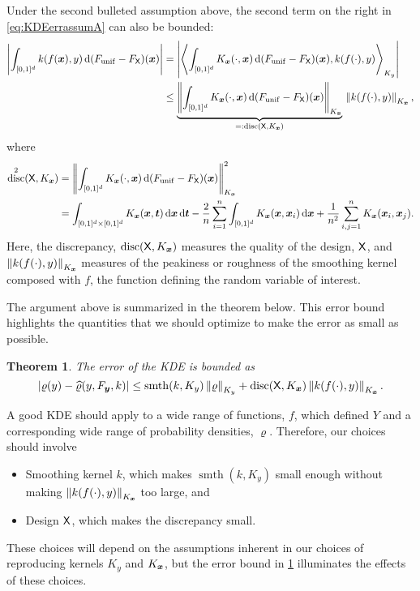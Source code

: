 \documentclass[letterpaper]{amsart}
\newtheorem{theorem}{Theorem}
\newcommand{\hvarrho}{\widehat{\varrho}}
\newcommand{\KY}{K_y}
\newcommand{\KX}{{K_{\vx}}}
\DeclareMathOperator{\smooth}{smth}
\DeclareMathOperator{\disc}{disc}
\begin{document}
Under the second bulleted assumption above, the second term on the right in \eqref{eq:KDEerrassumA} can also be bounded:
\begin{align}
	\label{eq:secondbd}
\abs{\int_{[0,1]^d} k(f(\vx),y) \,  \dif (F_{\mathrm{unif}} - F_{\mX})(\vx)}
& = \abs{\ip[\KY]{\int_{[0,1]^d} \KX(\cdot,\vx) \,  \dif (F_{\mathrm{unif}} - F_{\mX})(\vx)}{k(f(\cdot),y) }} \\
\nonumber
& \le  \underbrace{\norm[\KX]{\int_{[0,1]^d} \KX(\cdot,\vx) \,  \dif (F_{\mathrm{unif}} - F_{\mX})(\vx)}}_{=:\disc(\mX,\KX)} \, \norm[\KX]{k(f(\cdot),y) } ,
\end{align}
where
\begin{align*}
\disc^2(\mX,\KX) & = \norm[\KX]{\int_{[0,1]^d} \KX(\cdot,\vx) \,  \dif (F_{\mathrm{unif}} - F_{\mX})(\vx)}^2 \\
\nonumber
&=  \int_{[0,1]^d \times [0,1]^d} \KX(\vx,\vt) \, \dif \vx \, \dif \vt -
\frac 2n \sum_{i=1}^n \int_{[0,1]^d} \KX(\vx,\vx_i) \, \dif \vx  + \frac 1{n^2} \sum_{i,j=1}^n  \KX(\vx_i,\vx_j) .
\end{align*}
Here, the discrepancy, $\disc(\mX,\KX)$ measures the quality of the design, $\mathsf{X}$, and $\norm[\KX]{k(f(\cdot),y) }$ measures of the peakiness or roughness of the smoothing kernel composed with $f$, the function defining the random variable of interest.

The argument above is summarized in the theorem below.  This error bound highlights the quantities that we should optimize to make the error as small as possible.
\begin{theorem}\label{thm:errbd} The error of the KDE is bounded as
	\begin{equation}
			\abs{\varrho(y) - \hvarrho(y,F_{\vy},k)} \le \smooth(k,\KY) \norm[\KY]{\varrho} + \disc(\mX,\KX) \norm[\KX]{k(f(\cdot),y)}.
	\end{equation}
\end{theorem}
A good KDE should apply to a wide range of  functions, $f$, which defined $Y$ and a corresponding wide range of probability densities, $\varrho$.  Therefore, our choices should involve
\begin{itemize}
	\item  Smoothing kernel $k$, which makes $\smooth(k,\KY)$ small enough without making $\norm[\KX]{k(f(\cdot),y)}$ too large, and
	\item Design $\mathsf{X}$, which makes the discrepancy small.
\end{itemize}
These choices will depend on the assumptions inherent in our choices of reproducing kernels $\KY$ and $\KX$, but the error bound in \cref{thm:errbd} illuminates the effects of these choices.
\end{document}

